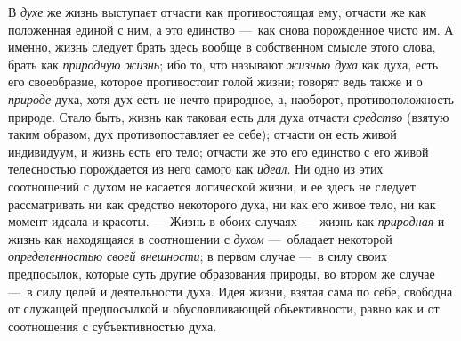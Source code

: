 \documentclass[twoside]{article}
\begin{document}
{{{В {\em духе}
же жизнь выступает отчасти как противостоящая ему, отчасти же
как положенная единой с ним, а это единство —~как снова
порожденное чисто им. А именно, жизнь следует брать здесь вообще в
собственном смысле этого слова, брать как
{\em природную жизнь};
ибо то, что называют
{\em жизнью духа} как
духа, есть его своеобразие, которое противостоит голой жизни; говорят ведь
также и о {\em природе}
духа, хотя дух есть не нечто природное, а, наоборот,
противоположность природе. Стало быть, жизнь как таковая есть для духа
отчасти {\em средство}
(взятую таким образом, дух противопоставляет ее себе);
отчасти он есть живой индивидуум, и жизнь есть его тело; отчасти же это его
единство с его живой телесностью порождается из него самого как
{\em идеал}. Ни одно из
этих соотношений с духом не касается логической жизни, и ее здесь не
следует рассматривать ни как средство некоторого духа, ни как его живое
тело, ни как момент идеала и красоты. — Жизнь в обоих
случаях —~жизнь как
{\em природная} и жизнь
как находящаяся в соотношении с
{\em духом} —~обладает
некоторой {\em определенностью своей
внешности}; в первом случае —~в силу своих
предпосылок, которые суть другие образования природы, во втором же случае
—~в силу целей и деятельности духа. Идея жизни, взятая сама
по себе, свободна от служащей предпосылкой и обусловливающей объективности,
равно как и от соотношения с субъективностью духа.

}}}
\end{document}
